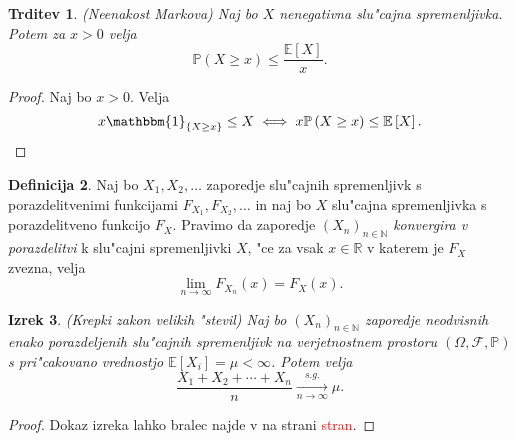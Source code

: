 \documentclass[12pt, a4paper, reqno]{amsart}
\theoremstyle{definition}
\newtheorem{definicija}{Definicija}[section]
\theoremstyle{plain}
\newtheorem{izrek}[definicija]{Izrek}
\newtheorem{trditev}[definicija]{Trditev}
\newcommand{\R}{\mathbb{R}}
\newcommand{\N}{\mathbb{N}}
\newcommand{\E}{\mathbb{E}}
\newcommand{\Prob}{\mathbb{P}}
\newcommand{\1}{\mathds{1}}
\begin{document}
    \begin{trditev}(Neenakost Markova)
        \label{trd:neenakostMarkova}
        Naj bo $X$ nenegativna slu"cajna spremenljivka.
        Potem za  $x>0$ velja
        \begin{equation*}
            \Prob\left(X \geq x\right) \leq \frac{\E\left[X\right]}{x}.
        \end{equation*}
    \end{trditev}

    \begin{proof}
        Naj bo $x > 0$. Velja
        \begin{equation*}
            x\mathbbm{1}_{\{X \geq x\}} \leq X \iff x\Prob\left(X \geq x\right) \leq \E\left[X\right].
        \end{equation*}
    \end{proof}

    \begin{definicija}
        Naj bo $X_1, X_2, \dots$ zaporedje slu"cajnih spremenljivk s porazdelitvenimi funkcijami
        $F_{X_1}, F_{X_2}, \dots$ in naj bo $X$ slu"cajna spremenljivka s porazdelitveno funkcijo $F_X$.
        Pravimo da zaporedje $(X_n)_{n\in\N}$ \textit{konvergira v porazdelitvi} k slu"cajni spremenljivki $X$,
        "ce za vsak $x\in\R$ v katerem je $F_X$ zvezna, velja
        \begin{equation*}
            \lim_{n\to\infty}F_{X_n}(x) = F_X(x).
        \end{equation*}
        \label{def:KonvergencaVPorazdelitvi}
    \end{definicija}

    \begin{izrek}(Krepki zakon velikih "stevil)
        Naj bo $(X_n)_{n\in\N}$ zaporedje neodvisnih enako porazdeljenih
        slu"cajnih spremenljivk na verjetnostnem prostoru $(\Omega, \mathcal{F}, \Prob)$
         s pri"cakovano vrednostjo $\E\left[X_i\right] = \mu <\infty$. Potem velja
        \begin{equation*}
            \frac{X_1 + X_2 + \cdots + X_n}{n}\xrightarrow[n\to\infty]{s.g.} \mu.
        \end{equation*}
        \label{izr:KrepkiZakonVelikihStevil}
    \end{izrek}

    \begin{proof}
        Dokaz izreka lahko bralec najde v \cite{7} na strani \textcolor{red}{stran}.
    \end{proof}
\end{document}
